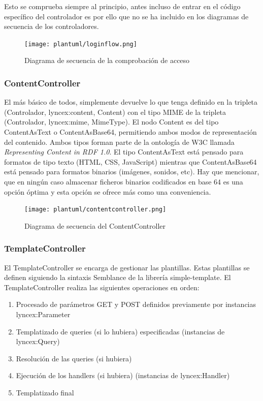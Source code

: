 \documentclass[12pt]{report} %
\begin{document}
Esto se comprueba siempre al principio, antes incluso de entrar en el código específico del controlador es por ello que no se ha incluido en los diagramas de secuencia de los controladores.

\begin{figure}[h]
    \centering
    \texttt{[image: plantuml/loginflow.png]}
    \caption{Diagrama de secuencia de la comprobación de acceso}
    \label{fig:loginflow}
\end{figure}

\subsubsection{ContentController}
El más básico de todos, simplemente devuelve lo que tenga definido en la tripleta (Controlador, lyncex:content, Content) con el tipo MIME 
de la tripleta (Controlador, lyncex:mime, MimeType). El nodo Content es del tipo ContentAsText o ContentAsBase64, permitiendo ambos modos de representación del contenido.
Ambos tipos forman parte de la ontología de W3C llamada \textit{Representing Content in RDF 1.0}\cite{cnt}.
El tipo ContentAsText está pensado para formatos de tipo texto (HTML, CSS, JavaScript) mientras que ContentAsBase64 está pensado para formatos binarios (imágenes, sonidos, etc).
Hay que mencionar, que en ningún caso almacenar ficheros binarios codificados en base 64 es una opción óptima y esta opción se ofrece más como una conveniencia.

\begin{figure}[h]
    \centering
    \texttt{[image: plantuml/contentcontroller.png]}
    \caption{Diagrama de secuencia del ContentController}
    \label{fig:contentcontroller}
\end{figure}

\subsubsection{TemplateController}
El TemplateController se encarga de gestionar las plantillas. Estas plantillas se definen siguiendo la sintaxis Semblance de la librería simple-template.
El TemplateController realiza las siguientes operaciones en orden:
\begin{enumerate}
    \item Procesado de parámetros GET y POST definidos previamente por instancias lyncex:Parameter
    \item Templatizado de queries (si lo hubiera) especificadas (instancias de lyncex:Query)
    \item Resolución de las queries (si hubiera)
    \item Ejecución de los handlers (si hubiera) (instancias de lyncex:Handler)
    \item Templatizado final
\end{enumerate}
\end{document}
